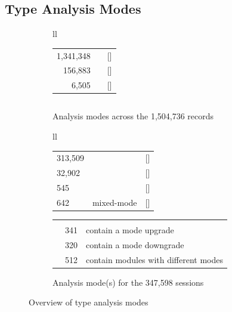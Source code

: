 \documentclass[english,submission,cleveref]{programming}
\begin{document}
\subsection{Type Analysis Modes}
\label{s:type-analysis-modes}

\begin{figure}[t]\centering
  \begin{subfigure}[t]{\columnwidth}
    \begin{tabular}[t]{ll}
      \begin{tabular}[t]{r@{~~}l@{~}r}
         1,341,348 & \mnocheck{}          & [\pct{89.14}] \\
           156,883 & \mnonstrict{}        & [\pct{10.43}] \\
             6,505 & \mstrict{}           & [\pct{ 0.43}]
      \end{tabular}
      \begin{tabular}[t]{r@{~~}l@{~~}r}
      \end{tabular}
    \end{tabular}
    \caption{Analysis modes across the 1,504,736 records}
    \label{f:total-records}
  \end{subfigure}

  \begin{subfigure}[t]{\columnwidth}
    \begin{tabular}[t]{ll} \\
      \begin{tabular}[t]{l@{~~}r@{~}l}
        313,509 & \mnocheck{}   & [\pct{90.19}] \\
         32,902 & \mnonstrict{} & [\pct{ 9.47}] \\
            545 & \mstrict{}    & [\pct{ 0.16}] \\
            642 & mixed-mode    & [\pct{ 0.18}]
      \end{tabular}
      \begin{tabular}[t]{l@{~~}ll}
        \zerowidth{Among the mixed-mode sessions:} \\
        & 341 & contain a mode upgrade \\
        & 320 & contain a mode downgrade \\
        & 512 & contain modules with different modes
      \end{tabular}
    \end{tabular}
    \caption{Analysis mode(s) for the 347,598 sessions}
    \label{f:total-sessions}
  \end{subfigure}

  \caption{Overview of type analysis modes}
  \label{f:dataset-overview}
\end{figure}
\end{document}
